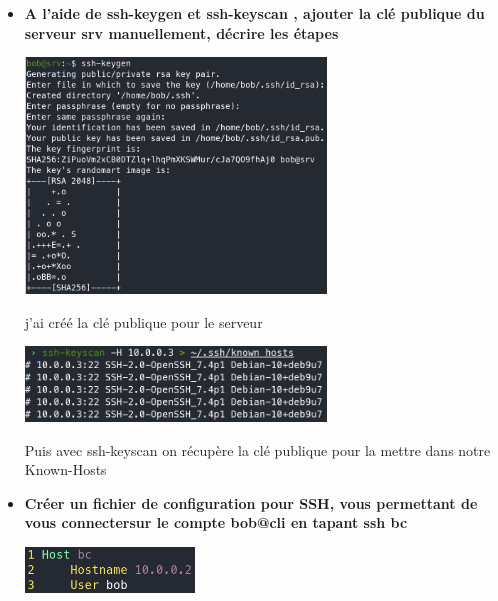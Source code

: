 \documentclass[12pt]{article}
\begin{document}
\begin{itemize}
  \item \textbf{A l'aide de ssh-keygen et ssh-keyscan , ajouter la clé publique du serveur srv manuellement,
  décrire les étapes}
  \vspace{0.3cm}

  \includegraphics[width=8cm]{images/screen-ssh-td3-1.png}
  \vspace{0.3cm}

  j'ai créé la clé publique pour le serveur
  \vspace{0.3cm}

  \includegraphics[width=8cm]{images/screen-ssh-td3-2.png}
  \vspace{0.3cm}

  Puis avec ssh-keyscan on récupère la clé publique pour la mettre dans notre Known-Hosts

\end{itemize}
\vspace{0.3cm}

\begin{itemize}
  \item \textbf{Créer un fichier de configuration pour SSH, vous permettant de vous connectersur le compte bob@cli
  en tapant ssh bc}
  \vspace{0.3cm}

  \includegraphics[width=4.5cm]{images/screen-ssh-td3-3.png}
  \vspace{0.3cm}

\end{itemize}
\vspace{0.3cm}
\end{document}
